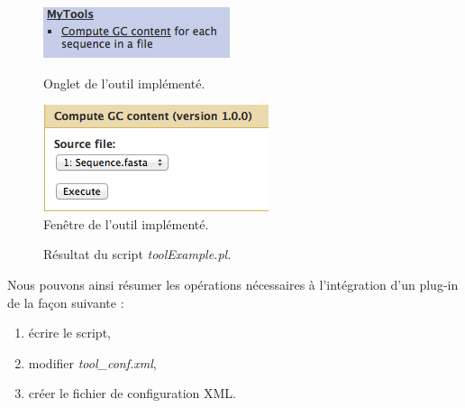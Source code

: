 \begin{figure}[!h]
   \begin{minipage}[b]{0.40\linewidth}
      \centering \includegraphics[scale=0.7]{Images/Ongletmytools.png}
      \caption{Onglet de l'outil implémenté.}
   \end{minipage}\hfill
   \begin{minipage}[b]{0.48\linewidth}   
      \centering \includegraphics[scale=0.5]{Images/Gccontent.png}
      \caption{Fenêtre de l'outil implémenté.}
   \end{minipage}
\end{figure}

 \begin{figure}[!h]
 \centering
{}
\caption{Résultat du script \textit{toolExample.pl}.}
\end{figure}

Nous pouvons ainsi résumer les opérations nécessaires à l'intégration d'un plug-in de la façon suivante : 
\begin{enumerate}
\item écrire le script,
\item modifier \textit{tool\_conf.xml},
\item créer le fichier de configuration XML.
\end{enumerate}